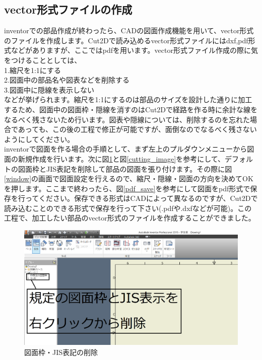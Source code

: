 \documentclass[b5paper, 9pt, twocolumn, titlepage,openany]{jsbook}%
\begin{document}
\clearpage
\begin{onecolumn}
\subsection{vector形式ファイルの作成}
inventorでの部品作成が終わったら、CADの図面作成機能を用いて、vector形式のファイルを作成します。Cut2Dで読み込めるvector形式ファイルにはdxf,pdf形式などがありますが、ここではpdfを用います。vector形式ファイル作成の際に気をつけることとしては、\\
  1.縮尺を1:1にする\\
  2.図面中の部品名や図表などを削除する\\
  3.図面中に隠線を表示しない\\
  などが挙げられます。縮尺を1:1にするのは部品のサイズを設計した通りに加工するため、図面中の図面枠・隠線を消すのはCut2Dで経路を作る時に余計な線をなるべく残さないため行います。図表や隠線については、削除するのを忘れた場合であっても、この後の工程で修正が可能ですが、面倒なのでなるべく残さないようにしてください。\\
inventorで図面を作る場合の手順として、まず左上のプルダウンメニューから図面の新規作成を行います。次に図\ref{no_jis}と図\ref{cutting_image}を参考にして、デフォルトの図面枠とJIS表記を削除して部品の図面を張り付けます。その際に図\ref{window}の画面で図面設定を行えるので、縮尺・隠線・図面の方向を決めてOKを押します。ここまで終わったら、図\ref{pdf_save}を参考にして図面をpdf形式で保存を行ってください。保存できる形式はCADによって異なるのですが、Cut2Dで読み込むことのできる形式で保存を行って下さい(.pdfや.dxfなどが可能)。この工程で、加工したい部品のvector形式のファイルを作成することができました。
\begin{figure}[tbh]
  \begin{center}
    \begin{minipage}{1.0\columnwidth}
      \includegraphics[width=\columnwidth]{plane_trim.png}
    \end{minipage}
    \caption{図面枠・JIS表記の削除    \label{no_jis}}
  \end{center}
\end{figure}


\end{onecolumn}
\end{document}
